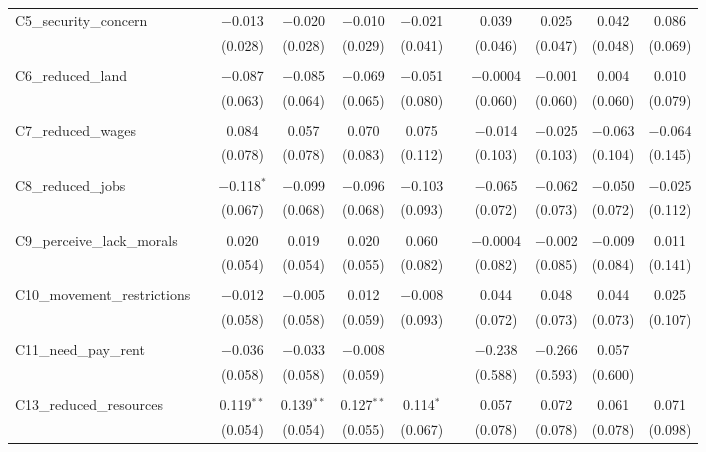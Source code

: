 \begin{table}[H]
\begin{tabular}{@{\extracolsep{4pt}}lcccccccccc}
 C5\_security\_concern &  & $-$0.013 & $-$0.020 & $-$0.010 & $-$0.021 &  & 0.039 & 0.025 & 0.042 & 0.086 \\ 
  &  & (0.028) & (0.028) & (0.029) & (0.041) &  & (0.046) & (0.047) & (0.048) & (0.069) \\ 
  & & & & & & & & & & \\ 
 C6\_reduced\_land &  & $-$0.087 & $-$0.085 & $-$0.069 & $-$0.051 &  & $-$0.0004 & $-$0.001 & 0.004 & 0.010 \\ 
  &  & (0.063) & (0.064) & (0.065) & (0.080) &  & (0.060) & (0.060) & (0.060) & (0.079) \\ 
  & & & & & & & & & & \\ 
 C7\_reduced\_wages &  & 0.084 & 0.057 & 0.070 & 0.075 &  & $-$0.014 & $-$0.025 & $-$0.063 & $-$0.064 \\ 
  &  & (0.078) & (0.078) & (0.083) & (0.112) &  & (0.103) & (0.103) & (0.104) & (0.145) \\ 
  & & & & & & & & & & \\ 
 C8\_reduced\_jobs &  & $-$0.118$^{*}$ & $-$0.099 & $-$0.096 & $-$0.103 &  & $-$0.065 & $-$0.062 & $-$0.050 & $-$0.025 \\ 
  &  & (0.067) & (0.068) & (0.068) & (0.093) &  & (0.072) & (0.073) & (0.072) & (0.112) \\ 
  & & & & & & & & & & \\ 
 C9\_perceive\_lack\_morals &  & 0.020 & 0.019 & 0.020 & 0.060 &  & $-$0.0004 & $-$0.002 & $-$0.009 & 0.011 \\ 
  &  & (0.054) & (0.054) & (0.055) & (0.082) &  & (0.082) & (0.085) & (0.084) & (0.141) \\ 
  & & & & & & & & & & \\ 
 C10\_movement\_restrictions &  & $-$0.012 & $-$0.005 & 0.012 & $-$0.008 &  & 0.044 & 0.048 & 0.044 & 0.025 \\ 
  &  & (0.058) & (0.058) & (0.059) & (0.093) &  & (0.072) & (0.073) & (0.073) & (0.107) \\ 
  & & & & & & & & & & \\ 
 C11\_need\_pay\_rent &  & $-$0.036 & $-$0.033 & $-$0.008 &  &  & $-$0.238 & $-$0.266 & 0.057 &  \\ 
  &  & (0.058) & (0.058) & (0.059) &  &  & (0.588) & (0.593) & (0.600) &  \\ 
  & & & & & & & & & & \\ 
 C13\_reduced\_resources &  & 0.119$^{**}$ & 0.139$^{**}$ & 0.127$^{**}$ & 0.114$^{*}$ &  & 0.057 & 0.072 & 0.061 & 0.071 \\ 
  &  & (0.054) & (0.054) & (0.055) & (0.067) &  & (0.078) & (0.078) & (0.078) & (0.098) \\ 

\end{tabular}
\end{table}
